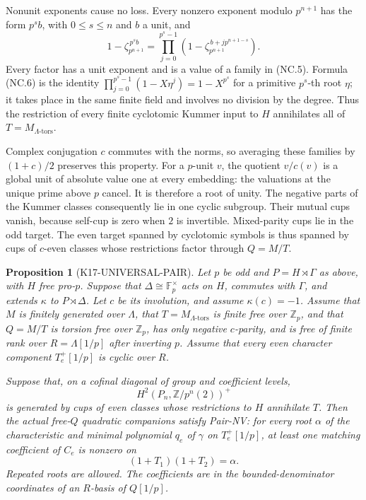 \documentclass[11pt,a4paper]{article}
\newtheorem{proposition}[theorem]{Proposition}
\theoremstyle{definition}
\begin{document}
Nonunit exponents cause no loss.  Every nonzero exponent modulo
\(p^{n+1}\) has the form \(p^s b\), with \(0\leq s\leq n\) and
\(b\) a unit, and
\[
 1-\zeta_{p^{n+1}}^{\,p^s b}
  =\prod_{j=0}^{p^s-1}
       \left(1-\zeta_{p^{n+1}}^{\,b+jp^{n+1-s}}\right).
                                                               \tag{NC.6}
\]
Every factor has a unit exponent and is a value of a family in
(NC.5).  Formula (NC.6) is the identity
\(\prod_{j=0}^{p^s-1}(1-X\eta^j)=1-X^{p^s}\) for a primitive
\(p^s\)-th root \(\eta\); it takes place in the same finite field
and involves no division by the degree.  Thus the restriction of
every finite cyclotomic Kummer input to \(H\) annihilates all of
\(T=M_{\Lambda\text{-tors}}\).

Complex conjugation \(c\) commutes with the norms, so averaging
these families by \((1+c)/2\) preserves this property.
For a \(p\)-unit \(v\), the quotient \(v/c(v)\) is a global unit
of absolute value one at every embedding: the valuations at the
unique prime above \(p\) cancel.  It is therefore a root of unity.
The negative parts of the Kummer classes consequently lie in one
cyclic subgroup.  Their mutual cups vanish, because self-cup is
zero when \(2\) is invertible.  Mixed-parity cups lie in the odd
target.  The even target spanned by cyclotomic symbols is thus
spanned by cups of \(c\)-even classes whose restrictions factor
through \(Q=M/T\).

\begin{proposition}[K17-UNIVERSAL-PAIR]\label{prop:universal-pair}
Let \(p\) be odd and \(P=H\rtimes\Gamma\) as above, with \(H\)
free pro-\(p\).  Suppose that
\(\Delta\cong\mathbb F_p^\times\) acts on \(H\), commutes with
\(\Gamma\), and extends \(\kappa\) to \(P\rtimes\Delta\).
Let \(c\) be its involution, and assume \(\kappa(c)=-1\).
Assume that \(M\) is finitely generated over \(\Lambda\), that
\(T=M_{\Lambda\text{-tors}}\) is finite free over \(\mathbb Z_p\),
and that \(Q=M/T\) is torsion free over \(\mathbb Z_p\), has only
negative \(c\)-parity, and is free of finite rank over
\(R=\Lambda[1/p]\) after inverting \(p\).
Assume that every even character component \(T_e^+[1/p]\) is
cyclic over \(R\).

Suppose that, on a cofinal diagonal of group and coefficient
levels,
\[
 H^2(P_n,\mathbb Z/p^n(2))^+
\]
is generated by cups of even classes whose restrictions to \(H\)
annihilate \(T\).  Then the actual free-\(Q\) quadratic companions
satisfy Pair-NV: for every root \(\alpha\) of the characteristic
and minimal polynomial \(q_e\) of \(\gamma\) on
\(T_e^+[1/p]\), at least one matching coefficient of \(C_e\) is
nonzero on
\[
                     (1+T_1)(1+T_2)=\alpha.                \tag{NC.7}
\]
Repeated roots are allowed.  The coefficients are in the
bounded-denominator coordinates of an \(R\)-basis of \(Q[1/p]\).
\end{proposition}
\end{document}
